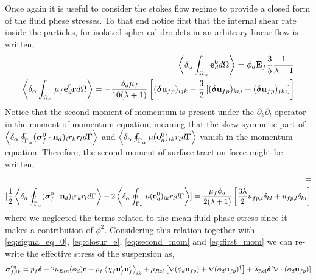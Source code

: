 Once again it is useful to consider the stokes flow regime to provide a closed form of the fluid phese stresses. 
To that end notice first that the internal shear rate inside the particles, for isolated spherical droplets in an arbitrary linear flow  is written, 
\begin{align*}
    \left<\delta_\alpha \int_{\Omega_\alpha} \textbf{e}_d^0 d\Omega\right>
    = 
    \phi_d 
    \textbf{E}_f
    \frac{3}{5}\frac{1}{\lambda+1}
    \\
    \left<\delta_\alpha \int_{\Omega_\alpha} \mu_f \textbf{e}_d^0\textbf{r}  d\Omega\right>
    = 
    - \frac{\phi_d\mu_f}{10(\lambda+1)}
    \left[
        (\bm\delta \textbf{u}_{fp})_{ijk}
        - \frac{3}{2}
        \left[
            (\bm\delta \textbf{u}_{fp})_{kij}
            + (\bm\delta \textbf{u}_{fp})_{jki}
        \right]
    \right]
    \label{eq:closur_e}
\end{align*}
Notice that the second moment of momentum is present under the $\partial_k\partial_l$ operator in the moment of momentum equation, meaning that the skew-symmetic part of $\left<\delta_\alpha \oint_{\Gamma_\alpha} (\bm{\sigma}_f^0 \cdot \textbf{n}_d)_ir_kr_l d\Gamma\right> $ and $\left<\delta_\alpha \oint_{\Gamma_\alpha} {\mu(\textbf{e}_d^0)_{ik} r_l} d\Gamma\right>$ vanish in the momentum equation. 
Therefore, the second moment of surface traction force might be written, 
\begin{align*}
    [\pavg{\intS{(\bm{\sigma}_f^0 \cdot \textbf{n}_d)_ir_k}} -
    2\pSavg{{\mu(\textbf{e}_d^0)_{ik}}} ]
    = 
    
    
    \\
    [\frac{1}{2}\pavg{\intS{(\bm{\sigma}_f^0 \cdot \textbf{n}_d)_ir_kr_l}} -
    2\pSavg{{\mu(\textbf{e}_d^0)_{ik} r_l}} ]
    = 
    \frac{\mu_f\phi_d}{2(\lambda +1) }
    \left[
        \frac{3\lambda}{2} 
        u_{fp,i}\delta_{kl}
        +  u_{fp,l}\delta_{ki}
    \right]
\end{align*}
where we neglected the terms related to the mean fluid phase stress since it makes a contribution of $\mathcal{\phi^2}$\citet{jackson1997locally}.
Considering this relation together with \ref{eq:sigma_eq_0}, \ref{eq:closur_e}, \ref{eq:second_mom} and \ref{eq:first_mom} we can re-write the effective stress of the suspension as, 
\begin{align*}
    \bm{\sigma}^\text{eq}_{f,ik} =
    p_f \bm\delta
    - 2 \mu_{Ein}(\phi_d) \textbf{e}
    + \rho_f\left<\chi_f\textbf{u}_f'\textbf{u}_f'\right>_{ik} 
    + \mu_{Rel} \left[\mathbf{\nabla} (\phi_d\textbf{u}_{fp}) + \mathbf{\nabla} (\phi_d\textbf{u}_{fp})^\dagger\right]
    + \lambda_\text{Rel}
        \bm\delta [\mathbf{\nabla}\cdot (\phi_d \textbf{u}_{fp})]
\end{align*} 